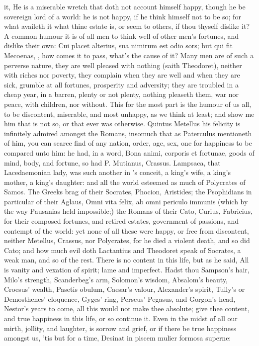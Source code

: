 {it, He is a miserable wretch that doth not account himself happy,
though he be sovereign lord of a world: he is not happy, if he think
himself not to be so; for what availeth it what thine estate is, or
seem to others, if thou thyself dislike it? A common humour it is of
all men to think well of other men's fortunes, and dislike their own:
Cui placet alterius, sua nimirum est odio sors; but qui fit
Mecoenas, \etc{}, how comes it to pass, what's the cause of it? Many men
are of such a perverse nature, they are well pleased with nothing
(saith Theodoret), neither with riches nor poverty, they
complain when they are well and when they are sick, grumble at all
fortunes, prosperity and adversity; they are troubled in a cheap year,
in a barren, plenty or not plenty, nothing pleaseth them, war nor
peace, with children, nor without. This for the most part is the humour
of us all, to be discontent, miserable, and most unhappy, as we think
at least; and show me him that is not so, or that ever was otherwise.
Quintus Metellus his felicity is infinitely admired amongst the Romans,
insomuch that as Paterculus mentioneth of him, you can scarce
find of any nation, order, age, sex, one for happiness to be compared
unto him: he had, in a word, Bona animi, corporis et fortunae, goods of
mind, body, and fortune, so had P. Mutianus, Crassus. Lampsaca,
that Lacedaemonian lady, was such another in \Pliny{}'s conceit, a
king's wife, a king's mother, a king's daughter: and all the world
esteemed as much of Polycrates of Samos. The Greeks brag of their
Socrates, Phocion, Aristides; the Psophidians in particular of their
Aglaus, Omni vita felix, ab omni periculo immunis (which by the way
Pausanias held impossible;) the Romans of their  Cato, Curius,
Fabricius, for their composed fortunes, and retired estates, government
of passions, and contempt of the world: yet none of all these were
happy, or free from discontent, neither Metellus, Crassus, nor
Polycrates, for he died a violent death, and so did Cato; and how much
evil doth Lactantius and Theodoret speak of Socrates, a weak man, and
so of the rest. There is no content in this life, but as he said,
All is vanity and vexation of spirit; lame and imperfect. Hadst thou
Sampson's hair, Milo's strength, Scanderbeg's arm, Solomon's wisdom,
Absalom's beauty, Croesus' wealth, Pasetis obulum, Caesar's valour,
Alexander's spirit, Tully's or Demosthenes' eloquence, Gyges' ring,
Perseus' Pegasus, and Gorgon's head, Nestor's years to come, all this
would not make thee absolute; give thee content, and true happiness in
this life, or so continue it. Even in the midst of all our mirth,
jollity, and laughter, is sorrow and grief, or if there be true
happiness amongst us, 'tis but for a time,
Desinat in piscem mulier formosa superne:

}
